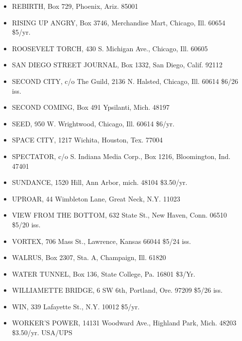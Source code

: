 \documentclass[11pt,twoside,a4paper]{book}
\begin{document}
\begin{minipage}[t]{0.20\textwidth}
\begin{scriptsize}
\begin{itemize}
	\item[] REBIRTH, Box 729, Phoenix, Ariz. 85001 
	\item[] RISING UP ANGRY, Box 3746, Merchandise Mart, Chicago, Ill. 60654	\$5/yr. 
	\item[] ROOSEVELT TORCH, 430 S. Michigan Ave., Chicago, Ill. 60605 
	\item[] SAN DIEGO STREET JOURNAL, Box 1332, San Diego, Calif. 92112 
	\item[] SECOND CITY, c/o The Guild, 2136 N. Halsted, Chicago, Ill. 60614	\$6/26 iss. 
	\item[] SECOND COMING, Box 491 Ypsilanti, Mich. 48197 
	\item[] SEED, 950 W. Wrightwood, Chicago, Ill. 60614 \$6/yr. 
	\item[] SPACE CITY, 1217 Wichita, Houston, Tex. 77004 
	\item[] SPECTATOR, c/o S. Indiana Media Corp., Box 1216, Bloomington, Ind.	47401 
	\item[] SUNDANCE, 1520 Hill, Ann Arbor, mich. 48104 \$3.50/yr. 
	\item[] UPROAR, 44 Wimbleton Lane, Great Neck, N.Y. 11023 
	\item[] VIEW FROM THE BOTTOM, 632 State St., New Haven, Conn. 06510	\$5/20 iss. 
	\item[] VORTEX, 706 Mass St., Lawrence, Kansas 66044 \$5/24 iss. 
	\item[] WALRUS, Box 2307, Sta. A, Champaign, Ill. 61820 
	\item[] WATER TUNNEL, Box 136, State College, Pa. 16801 \$3/Yr. 
\end{itemize}
\end{scriptsize}
\end{minipage}\hfill
\begin{minipage}[t]{0.20\textwidth}
\begin{scriptsize}
\begin{itemize}
	\item[] WILLIAMETTE BRIDGE, 6 SW 6th, Portland, Ore. 97209 \$5/26 iss. 
	\item[] WIN, 339 Lafayette St., N.Y. 10012 \$5/yr. 
	\item[] WORKER'S POWER, 14131 Woodward Ave., Highland Park, Mich. 48203	\$3.50/yr. USA/UPS
\end{itemize}
\end{scriptsize}
\end{minipage}\hfill
\end{document}

